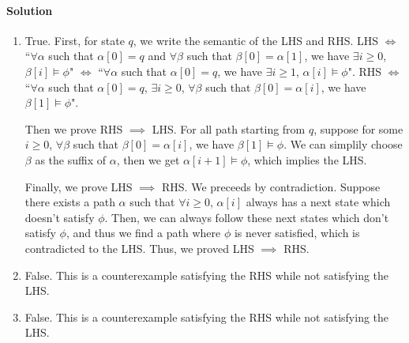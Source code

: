 \documentclass[11pt]{article}
\begin{document}
\paragraph{Solution}
\begin{enumerate}
\item True. First, for state $q$, we write the semantic of the LHS and RHS. LHS $\iff$ ``$\forall \alpha$ such that $\alpha[0] = q$ and $\forall \beta$ such that $\beta[0] = \alpha[1]$, we have $\exists i \geq 0$, $\beta[i] \models \phi$" $\iff$ ``$\forall \alpha$ such that $\alpha[0] = q$, we have $\exists i \geq 1$, $\alpha[i] \models \phi$". RHS $\iff$ ``$\forall \alpha$ such that $\alpha[0] = q$, $\exists i \geq 0$, $\forall \beta$ such that $\beta[0] = \alpha[i]$, we have $\beta[1] \models \phi$".

Then we prove RHS $\implies$ LHS. For all path starting from $q$, suppose  for some $i \geq 0$, $\forall \beta$ such that $\beta[0] = \alpha[i]$, we have $\beta[1] \models \phi$. We can simplily choose $\beta$ as the suffix of $\alpha$, then we get $\alpha[i+1] \models \phi$, which implies the LHS.

Finally, we prove LHS $\implies$ RHS. We preceeds by contradiction. Suppose there exists a path $\alpha$ such that $\forall i \geq 0$, $\alpha[i]$ always has a next state which doesn't satisfy $\phi$. Then, we can always follow these next states which don't satisfy $\phi$, and thus we find a path where $\phi$ is never satisfied, which is contradicted to the LHS. Thus, we proved LHS $\implies$ RHS.

\item False. This is a counterexample satisfying the RHS while not satisfying the LHS.


\item False. This is a counterexample satisfying the RHS while not satisfying the LHS.



\end{enumerate}
\end{document}
